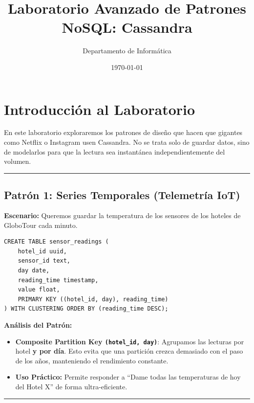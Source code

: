 \documentclass[12pt,a4paper]{article}
\title{\textbf{Laboratorio Avanzado de Patrones NoSQL: Cassandra}}
\author{Departamento de Informática}
\date{\today}
\begin{document}
\maketitle

\section{Introducción al Laboratorio}\label{intro}
En este laboratorio exploraremos los patrones de diseño que hacen que gigantes como Netflix o Instagram usen Cassandra. No se trata solo de guardar datos, sino de modelarlos para que la lectura sea instantánea independientemente del volumen.

\begin{center}\rule{0.5\linewidth}{0.5pt}\end{center}

\subsection{Patrón 1: Series Temporales (Telemetría IoT)}\label{iot}
\textbf{Escenario:} Queremos guardar la temperatura de los sensores de los hoteles de GloboTour cada minuto.

\begin{tcolorbox}[title=Diseño de la Tabla]
\begin{lstlisting}[language=CQL]
CREATE TABLE sensor_readings (
    hotel_id uuid,
    sensor_id text,
    day date,
    reading_time timestamp,
    value float,
    PRIMARY KEY ((hotel_id, day), reading_time)
) WITH CLUSTERING ORDER BY (reading_time DESC);
\end{lstlisting}
\end{tcolorbox}

\textbf{Análisis del Patrón:}
\begin{itemize}
    \item \textbf{Composite Partition Key \texttt{(hotel\_id, day)}}: Agrupamos las lecturas por hotel \textbf{y por día}. Esto evita que una partición crezca demasiado con el paso de los años, manteniendo el rendimiento constante.
    \item \textbf{Uso Práctico:} Permite responder a \enquote{Dame todas las temperaturas de hoy del Hotel X} de forma ultra-eficiente.
\end{itemize}

\begin{center}\rule{0.5\linewidth}{0.5pt}\end{center}
\end{document}

